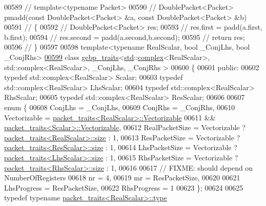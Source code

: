 \begin{DoxyCode}
00589 \textcolor{comment}{// template<typename Packet>}
00590 \textcolor{comment}{// DoublePacket<Packet> pmadd(const DoublePacket<Packet> &a, const DoublePacket<Packet> &b)}
00591 \textcolor{comment}{// \{}
00592 \textcolor{comment}{//   DoublePacket<Packet> res;}
00593 \textcolor{comment}{//   res.first  = padd(a.first, b.first);}
00594 \textcolor{comment}{//   res.second = padd(a.second,b.second);}
00595 \textcolor{comment}{//   return res;}
00596 \textcolor{comment}{// \}}
00597 
00598 \textcolor{keyword}{template}<\textcolor{keyword}{typename} RealScalar, \textcolor{keywordtype}{bool} \_ConjLhs, \textcolor{keywordtype}{bool} \_ConjRhs>
\hyperlink{class_eigen_1_1internal_1_1gebp__traits_3_01std_1_1complex_3_01_real_scalar_01_4_00_01std_1_1com3fbe501975c876a010def81ad2701521}{00599} \textcolor{keyword}{class }\hyperlink{class_eigen_1_1internal_1_1gebp__traits}{gebp\_traits}<\hyperlink{namespacestd}{std}::\hyperlink{structcomplex}{complex}<RealScalar>, std::complex<RealScalar>, \_ConjLhs, 
      \_ConjRhs >
00600 \{
00601 \textcolor{keyword}{public}:
00602   \textcolor{keyword}{typedef} std::complex<RealScalar>  Scalar;
00603   \textcolor{keyword}{typedef} std::complex<RealScalar>  LhsScalar;
00604   \textcolor{keyword}{typedef} std::complex<RealScalar>  RhsScalar;
00605   \textcolor{keyword}{typedef} std::complex<RealScalar>  ResScalar;
00606   
00607   \textcolor{keyword}{enum} \{
00608     ConjLhs = \_ConjLhs,
00609     ConjRhs = \_ConjRhs,
00610     Vectorizable = \hyperlink{struct_eigen_1_1internal_1_1packet__traits}{packet\_traits<RealScalar>::Vectorizable}
00611                 && \hyperlink{struct_eigen_1_1internal_1_1packet__traits}{packet\_traits<Scalar>::Vectorizable},
00612     RealPacketSize  = Vectorizable ? \hyperlink{struct_eigen_1_1internal_1_1packet__traits}{packet\_traits<RealScalar>::size} : 1,
00613     ResPacketSize   = Vectorizable ? \hyperlink{struct_eigen_1_1internal_1_1packet__traits}{packet\_traits<ResScalar>::size} : 1,
00614     LhsPacketSize = Vectorizable ? \hyperlink{struct_eigen_1_1internal_1_1packet__traits}{packet\_traits<LhsScalar>::size} : 1,
00615     RhsPacketSize = Vectorizable ? \hyperlink{struct_eigen_1_1internal_1_1packet__traits}{packet\_traits<RhsScalar>::size} : 1,
00616 
00617     \textcolor{comment}{// FIXME: should depend on NumberOfRegisters}
00618     nr = 4,
00619     mr = ResPacketSize,
00620 
00621     LhsProgress = ResPacketSize,
00622     RhsProgress = 1
00623   \};
00624   
00625   \textcolor{keyword}{typedef} \textcolor{keyword}{typename} \hyperlink{group___sparse_core___module}{packet\_traits<RealScalar>::type} 

\end{DoxyCode}
